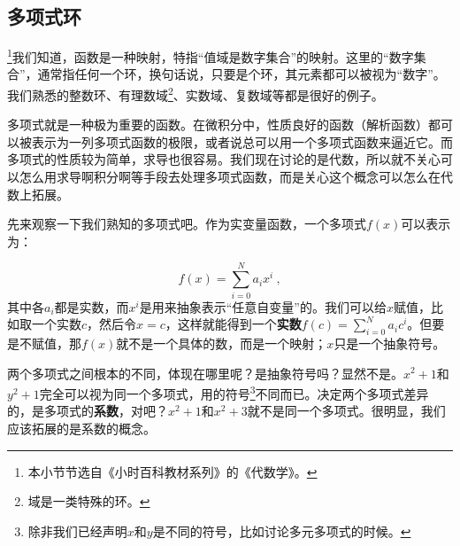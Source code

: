 

\subsection{多项式环}
\footnote{本小节节选自《小时百科教材系列》的《代数学》。}我们知道，函数是一种映射，特指“值域是数字集合”的映射。这里的“数字集合”，通常指任何一个环，换句话说，只要是个环，其元素都可以被视为“数字”。我们熟悉的整数环、有理数域\footnote{域是一类特殊的环。}、实数域、复数域等都是很好的例子。

多项式就是一种极为重要的函数。在微积分中，性质良好的函数（解析函数）都可以被表示为一列多项式函数的极限，或者说总可以用一个多项式函数来逼近它。而多项式的性质较为简单，求导也很容易。我们现在讨论的是代数，所以就不关心可以怎么用求导啊积分啊等手段去处理多项式函数，而是关心这个概念可以怎么在代数上拓展。

先来观察一下我们熟知的多项式吧。作为实变量函数，一个多项式$f(x)$可以表示为：

\begin{equation}
    f(x) = \sum_{i=0}^N a_i x^i~,
\end{equation}
其中各$a_i$都是实数，而$x^i$是用来抽象表示“任意自变量”的。我们可以给$x$赋值，比如取一个实数$c$，然后令$x=c$，这样就能得到一个\textbf{实数}$f(c)=\sum_{i=0}^N a_i c^i$。但要是不赋值，那$f(x)$就不是一个具体的数，而是一个映射；$x$只是一个抽象符号。

两个多项式之间根本的不同，体现在哪里呢？是抽象符号吗？显然不是。$x^2+1$和$y^2+1$完全可以视为同一个多项式，用的符号\footnote{除非我们已经声明$x$和$y$是不同的符号，比如讨论多元多项式的时候。}不同而已。决定两个多项式差异的，是多项式的\textbf{系数}，对吧？$x^2+1$和$x^2+3$就不是同一个多项式。很明显，我们应该拓展的是系数的概念。




